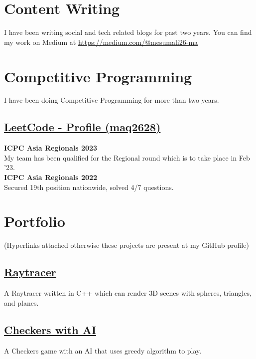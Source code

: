 \documentclass[]{resume}
\begin{document}
\begin{minipage}[t]{0.5\textwidth}


    \section{Content Writing}
    I have been writing social and tech related blogs for past two years. You can find my work on Medium at \href{https://medium.com/@mesumali26-ma}{https://medium.com/@mesumali26-ma}

    \section{Competitive Programming}
    I have been doing Competitive Programming for more than two years.\\
    \subsection{\href{https://leetcode.com/maq2628/}{\textbf{LeetCode - Profile (maq2628)}}}
    \textbf{ICPC Asia Regionals 2023}\\
    My team has been qualified for the Regional round which is to take place in Feb '23. \\
    \textbf{ICPC Asia Regionals 2022}\\
    Secured 19th position nationwide, solved 4/7 questions.


    \section{Portfolio}
     (Hyperlinks attached otherwise these projects are present at my GitHub profile)\\

    \subsection{\href{https://github.com/Qazalbash/Raytracer}{\textbf{Raytracer}}}%
    A Raytracer written in C++ which can render 3D scenes with spheres, triangles, and planes.

    \subsection{\href{https://github.com/Qazalbash/Checkers-with-AI}{\textbf{Checkers with AI}}}%
    A Checkers game with an AI that uses greedy algorithm to play.


\end{minipage}
\end{document}
